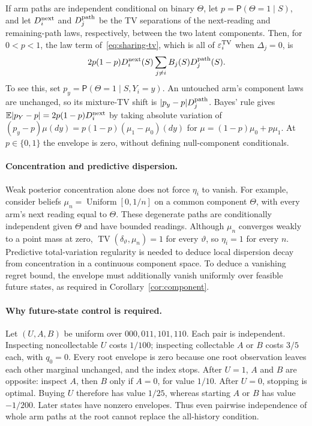 If arm paths are independent conditional on binary $\Theta$, let
$p=\mathsf P(\Theta=1\mid S)$, and let $D_i^{\rm next}$ and $D_j^{\rm path}$ be the
TV separations of the next-reading and remaining-path laws, respectively,
between the two latent components. Then, for $0<p<1$, the law term
of~\eqref{eq:sharing-tv}, which is all of $\varepsilon_i^{\rm TV}$ when $\Delta_j=0$, is
\begin{equation}
 2p(1-p)D_i^{\rm next}(S)\sum_{j\ne i} B_j(S)D_j^{\rm path}(S).
 \label{eq:sharing-binary}
\end{equation}
To see this, set $p_y=\mathsf P(\Theta=1\mid S,Y_i=y)$. An untouched arm's component
laws are unchanged, so its mixture-TV shift is
$|p_y-p|D_j^{\rm path}$. Bayes' rule gives
$\mathbb{E}|p_Y-p|=2p(1-p)D_i^{\rm next}$ by taking absolute variation of
$(p_y-p)\mu(dy)=p(1-p)(\mu_1-\mu_0)(dy)$ for
$\mu=(1-p)\mu_0+p\mu_1$. At $p\in\{0,1\}$ the envelope is zero, without
defining null-component conditionals.

\paragraph{Concentration and predictive dispersion.}
Weak posterior concentration alone does not force $\eta_i$ to vanish.
For example, consider beliefs $\mu_n=\operatorname{Uniform}[0,1/n]$ on a common
component $\Theta$, with every arm's next reading equal to $\Theta$.
These degenerate paths are conditionally independent given $\Theta$ and have
bounded readings. Although $\mu_n$ converges weakly to a point mass at zero,
$\operatorname{TV}(\delta_\vartheta,\mu_n)=1$ for every $\vartheta$, so
$\eta_i=1$ for every $n$. Predictive total-variation regularity is needed to
deduce local dispersion decay from concentration in a continuous component
space. To deduce a vanishing regret bound, the envelope must additionally
vanish uniformly over feasible future states, as required in
Corollary~\ref{cor:component}.

\paragraph{Why future-state control is required.}
Let $(U,A,B)$ be uniform over $000,011,101,110$. Each pair is independent.
Inspecting noncollectable $U$ costs $1/100$; inspecting collectable $A$ or $B$
costs $3/5$ each, with $q_0=0$. Every root envelope is zero because one root
observation leaves each other marginal unchanged, and the index stops.
After $U=1$, $A$ and $B$ are opposite: inspect $A$, then $B$ only if $A=0$,
for value $1/10$. After $U=0$, stopping is optimal. Buying $U$ therefore has
value $1/25$, whereas starting $A$ or $B$ has value $-1/200$. Later states have
nonzero envelopes. Thus even pairwise independence of whole arm paths at the
root cannot replace the all-history condition.
